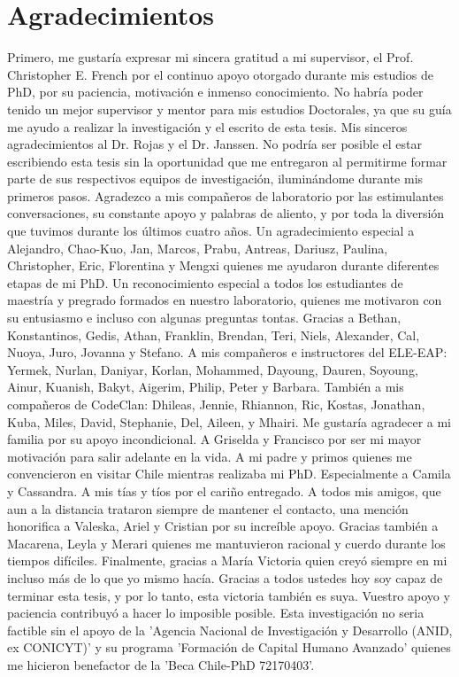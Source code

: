 \chapter{Agradecimientos}

Primero, me gustaría expresar mi sincera gratitud a mi supervisor, el Prof. Christopher E. French por el continuo apoyo otorgado durante mis estudios de PhD, por su paciencia, motivación e inmenso conocimiento. No habría poder tenido un mejor supervisor y mentor para mis estudios Doctorales, ya que su guía me ayudo a realizar la investigación y el escrito de esta tesis.
Mis sinceros agradecimientos al Dr. Rojas y el Dr. Janssen. No podría ser posible el estar escribiendo esta tesis sin la oportunidad que me entregaron al permitirme formar parte de sus respectivos equipos de investigación, iluminándome durante mis primeros pasos.
Agradezco a mis compañeros de laboratorio por las estimulantes conversaciones, su constante apoyo y palabras de aliento, y por toda la diversión que tuvimos durante los últimos cuatro años. Un agradecimiento especial a Alejandro, Chao-Kuo, Jan, Marcos, Prabu, Antreas, Dariusz, Paulina, Christopher, Eric, Florentina y Mengxi quienes me ayudaron durante diferentes etapas de mi PhD. Un reconocimiento especial a todos los estudiantes de maestría y pregrado formados en nuestro laboratorio, quienes me motivaron con su entusiasmo e incluso con algunas preguntas tontas. Gracias a Bethan, Konstantinos, Gedis, Athan, Franklin, Brendan, Teri, Niels, Alexander, Cal, Nuoya, Juro, Jovanna y Stefano. 
A mis compañeros e instructores del ELE-EAP: Yermek, Nurlan, Daniyar, Korlan, Mohammed, Dayoung, Dauren, Soyoung, Ainur, Kuanish, Bakyt, Aigerim, Philip, Peter y Barbara. También a mis compañeros de CodeClan: Dhileas, Jennie, Rhiannon, Ric, Kostas, Jonathan, Kuba, Miles, David, Stephanie, Del, Aileen, y Mhairi.
Me gustaría agradecer a mi familia por su apoyo incondicional. A Griselda y Francisco por ser mi mayor motivación para salir adelante en la vida. A mi padre y primos quienes me convencieron en visitar Chile mientras realizaba mi PhD. Especialmente a Camila y Cassandra. A mis tías y tíos por el cariño entregado. A todos mis amigos, que aun a la distancia trataron siempre de mantener el contacto, una mención honorifica a Valeska, Ariel y Cristian por su increíble apoyo. Gracias también a Macarena, Leyla y Merari quienes me mantuvieron racional y cuerdo durante los tiempos difíciles. Finalmente, gracias a María Victoria quien creyó siempre en mi incluso más de lo que yo mismo hacía. Gracias a todos ustedes hoy soy capaz de terminar esta tesis, y por lo tanto, esta victoria también es suya. Vuestro apoyo y paciencia contribuyó a hacer lo imposible posible.
Esta investigación no seria factible sin el apoyo de la 'Agencia Nacional de Investigación y Desarrollo (ANID, ex CONICYT)' y su programa 'Formación de Capital Humano Avanzado' quienes me hicieron benefactor de la 'Beca Chile-PhD 72170403'.
